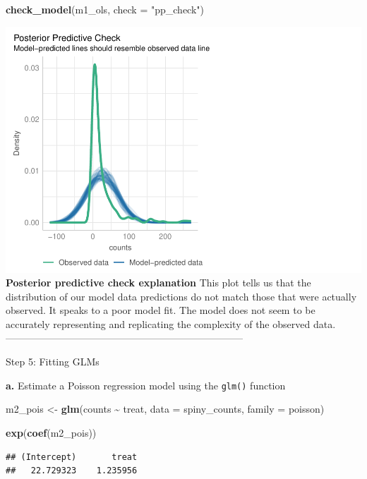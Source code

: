 \documentclass[
]{article}
\newenvironment{Shaded}{\begin{snugshade}}{\end{snugshade}}
\newcommand{\AttributeTok}[1]{\textcolor[rgb]{0.13,0.29,0.53}{#1}}
\newcommand{\FunctionTok}[1]{\textcolor[rgb]{0.13,0.29,0.53}{\textbf{#1}}}
\newcommand{\NormalTok}[1]{#1}
\newcommand{\OtherTok}[1]{\textcolor[rgb]{0.56,0.35,0.01}{#1}}
\newcommand{\SpecialCharTok}[1]{\textcolor[rgb]{0.81,0.36,0.00}{\textbf{#1}}}
\newcommand{\StringTok}[1]{\textcolor[rgb]{0.31,0.60,0.02}{#1}}
\begin{document}
\begin{Shaded}
\begin{Highlighting}[]
\FunctionTok{check\_model}\NormalTok{(m1\_ols, }\AttributeTok{check =} \StringTok{"pp\_check"}\NormalTok{)}
\end{Highlighting}
\end{Shaded}

\includegraphics{hw1-lobstrs-eds241_files/figure-latex/unnamed-chunk-17-1.pdf}
\textbf{Posterior predictive check explanation} This plot tells us that
the distribution of our model data predictions do not match those that
were actually observed. It speaks to a poor model fit. The model does
not seem to be accurately representing and replicating the complexity of
the observed data.
------------------------------------------------------------------------

Step 5: Fitting GLMs

\textbf{a.} Estimate a Poisson regression model using the \texttt{glm()}
function

\begin{Shaded}
\begin{Highlighting}[]
\NormalTok{m2\_pois }\OtherTok{\textless{}{-}} \FunctionTok{glm}\NormalTok{(counts }\SpecialCharTok{\textasciitilde{}}\NormalTok{ treat, }
                   \AttributeTok{data =}\NormalTok{ spiny\_counts,}
                   \AttributeTok{family =}\NormalTok{ poisson) }

\FunctionTok{exp}\NormalTok{(}\FunctionTok{coef}\NormalTok{(m2\_pois))}
\end{Highlighting}
\end{Shaded}

\begin{verbatim}
## (Intercept)       treat 
##   22.729323    1.235956
\end{verbatim}
\end{document}
